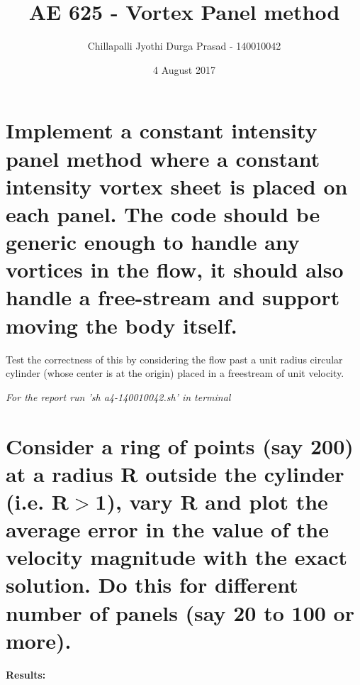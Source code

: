 \documentclass[a4paper,11pt]{article}
\title{AE 625 - Vortex Panel method}
\author{Chillapalli Jyothi Durga Prasad - 140010042 }
\date{4 August 2017}
\begin{document}
	\maketitle
	
	
	\tableofcontents
	\listoffigures
	
	
	\newpage
	\section*{\small{\indent Implement a constant intensity panel method where a constant intensity vortex sheet is placed on each panel. The code should be generic enough to handle any vortices in the flow, it should also handle a free-stream and support moving the body itself.}}
	
	
	
	
	
	{\indent\indent  Test the correctness of this by considering the flow past a unit radius circular cylinder (whose center is at the origin) placed in a freestream of unit velocity.\\}
	
	\emph{For the report run 'sh a4-140010042.sh' in terminal}
	
	\section{Consider a ring of points (say 200) at a radius R outside the cylinder (i.e. R$>$1), vary R and plot the average error in the value of the velocity magnitude with the exact solution. Do this for different number of panels (say 20 to 100 or more).}
	\textbf{Results:}\\
	
\end{document}
